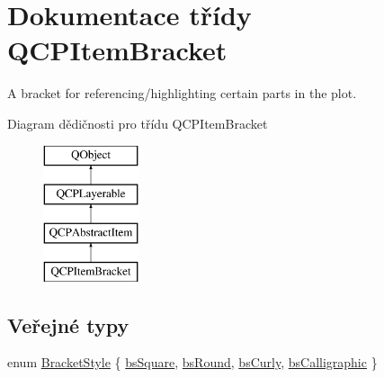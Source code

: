 \hypertarget{classQCPItemBracket}{}\section{Dokumentace třídy Q\+C\+P\+Item\+Bracket}
\label{classQCPItemBracket}


A bracket for referencing/highlighting certain parts in the plot.  


Diagram dědičnosti pro třídu Q\+C\+P\+Item\+Bracket\begin{figure}[H]
\begin{center}
\leavevmode
\includegraphics[height=4.000000cm]{classQCPItemBracket}
\end{center}
\end{figure}
\subsection*{Veřejné typy}
\begin{DoxyCompactItemize}
\item 
enum \hyperlink{classQCPItemBracket_a7ac3afd0b24a607054e7212047d59dbd}{Bracket\+Style} \{ \hyperlink{classQCPItemBracket_a7ac3afd0b24a607054e7212047d59dbda7f9df4a7359bfe3dac1dbe4ccf5d220c}{bs\+Square}, 
\hyperlink{classQCPItemBracket_a7ac3afd0b24a607054e7212047d59dbda394627b0830a26ee3e0a02ca67a9f918}{bs\+Round}, 
\hyperlink{classQCPItemBracket_a7ac3afd0b24a607054e7212047d59dbda5024ce4023c2d8de4221f1cd4816acd8}{bs\+Curly}, 
\hyperlink{classQCPItemBracket_a7ac3afd0b24a607054e7212047d59dbda8f29f5ef754e2dc9a9efdedb2face0f3}{bs\+Calligraphic}
 \}
\end{DoxyCompactItemize}
